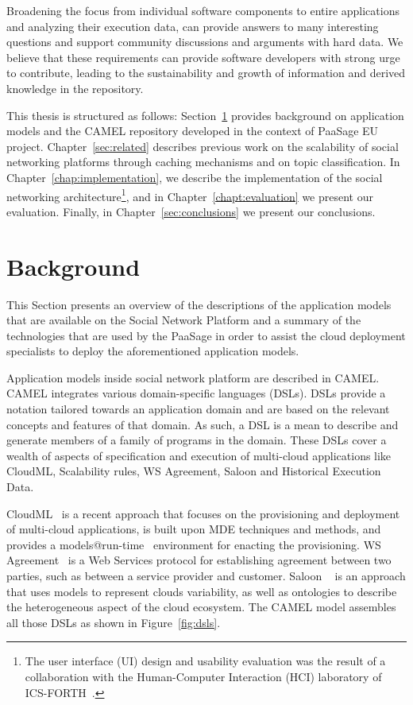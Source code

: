 Broadening the focus from individual software components to entire applications and analyzing their execution data, can provide answers to many interesting questions and support community discussions and arguments with hard data. 
We believe that these requirements can provide software developers with strong urge to contribute, leading to the sustainability and growth of information and derived knowledge in the repository.

This thesis is structured as follows: Section~\ref{sec:background} provides background on application models and the CAMEL repository developed in the context of PaaSage EU project. Chapter~\ref{sec:related} describes previous work on the scalability of social networking platforms through caching mechanisms and on topic classification. In Chapter~\ref{chap:implementation}, we describe the implementation of the social networking architecture\footnote{The user interface (UI) design and usability evaluation was the result of a collaboration with the Human-Computer Interaction (HCI) laboratory of ICS-FORTH~\cite{magoutis2015design}.}, and in Chapter~\ref{chapt:evaluation} we present our evaluation. Finally, in Chapter~\ref{sec:conclusions} we present our conclusions.

\section{Background}
\label{sec:background}
This Section presents an overview of the descriptions of the application models that are available on the Social Network Platform and a summary of the technologies that are used by the PaaSage in order to assist the cloud deployment specialists to deploy the aforementioned application models.

Application models inside social network platform are described in CAMEL. CAMEL integrates various domain-specific languages (DSLs).
DSLs provide a notation tailored towards an application domain and are based on the relevant concepts and features of that domain. As such, a DSL is a mean to describe and generate members of a family of programs in the domain. 
These DSLs cover a wealth of aspects of specification and execution of multi-cloud applications like CloudML, Scalability rules, WS Agreement, Saloon and Historical Execution Data. 

CloudML~\cite{FerryRossiniCMS13} is a recent approach that focuses on the provisioning and deployment of multi-cloud applications, is built upon MDE techniques and methods, and provides a models@run-time~\cite{models-runtime} environment for enacting the provisioning.  WS Agreement~\cite{andrieux2007web} is a Web Services protocol for establishing agreement between two parties, such as between a service provider and customer. Saloon ~\cite{quinton2013towards} is an approach that uses models to represent clouds variability, as well as ontologies to describe the heterogeneous aspect of the cloud ecosystem. The CAMEL model assembles all those DSLs as shown in Figure~\ref{fig:dsls}.

